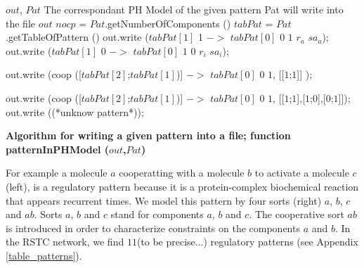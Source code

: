 
\begin{algorithm}
\begin{algorithmic}[H]
\REQUIRE $out$, $Pat$ 
\ENSURE The correspondant PH Model of the given pattern Pat will write into the file $out$
\STATE $nocp$ = $Pat$.getNumberOfComponents () 
\STATE $tabPat$ = $Pat$.getTableOfPattern () 
  \STATE out.write ($tabPat[1]$ 1 $->$ $tabPat[0]$ $0$ $1$ $r_{a}$ $sa_{a}$);       
\ENDCASE
{}
  \STATE out.write ($tabPat[1]$ 0 $->$ $tabPat[0]$ $1$ $0$ $r_{i}$ $sa_{i}$);    
\ENDSWITCH
   
   
\ENDCASE

   \STATE out.write (coop ([$tabPat[2]$;$tabPat[1]$)] $->$ $tabPat[0]$ $0$ $1$, [[$1$;$1$]] ); 
        
\ENDCASE
{}
  \STATE out.write (coop ([$tabPat[2]$;$tabPat[1]$)] $->$ $tabPat[0]$ $0$ $1$, [[$1$;$1$],[$1$;$0$],[$0$;$1$]]); 
\DEFAULT
 \STATE out.write ((*unknow pattern*));
 \ENDDEFAULT
\ENDSWITCH
   
   
\ENDCASE
\ENDSWITCH
\end{algorithmic}
\caption{\bf Algorithm for writing a given pattern into a file; function patternInPHModel ($out$,$Pat$)} \label{PHModelGeneration}
\end{algorithm}


For example a molecule $a$ cooperatting with a molecule $b$ to activate a molecule $c$  (left), is a regulatory pattern because it is a protein-complex biochemical reaction that appears recurrent times.  
We model this pattern by four sorts  (right) $a$, $b$, $c$ and $ab$. Sorts $a$, $b$ and $c$
stand for components $a$, $b$ and $c$. The cooperative sort $ab$ is introduced in order to characterize constraints on the components $a$ and $b$.
In the RSTC network, we find $11$(to be precise...) regulatory patterns (see Appendix \ref{table_patterns}).     %


